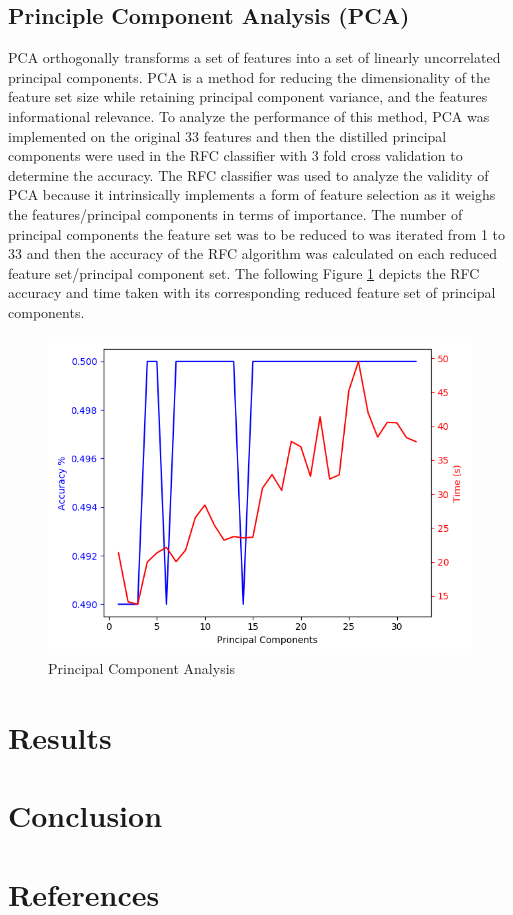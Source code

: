 \documentclass{article}
\begin{document}
\subsection{Principle Component Analysis (PCA)}
PCA orthogonally transforms a set of features into a set of linearly uncorrelated principal components. PCA is a method for reducing the dimensionality of the feature set size while retaining principal component variance, and the features informational relevance. To analyze the performance of this method, PCA was implemented on the original 33 features and then the distilled principal components were used in the RFC classifier with 3 fold cross validation to determine the accuracy. The RFC classifier was used to analyze the validity of PCA because it intrinsically implements a form of feature selection as it weighs the features/principal components in terms of importance. The number of principal components the feature set was to be reduced to was iterated from 1 to 33 and then the accuracy of the RFC algorithm was calculated on each reduced feature set/principal component set. The following Figure \ref{fig:PCA} depicts the RFC accuracy and time taken with its corresponding reduced feature set of principal components.   

\begin{figure}[h!]
	\centering
	\includegraphics[width=\linewidth]{data/PCAT1.png}
	\caption{Principal Component Analysis}
	\label{fig:PCA}
\end{figure}

\section{Results}
\section{Conclusion}

\section*{References}
 

\end{document}
